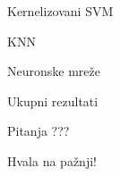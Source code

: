 \documentclass{beamer}
\begin{document}
\begin{frame}{Kernelizovani SVM}
\end{frame}

\begin{frame}{KNN}
\end{frame}

\begin{frame}{Neuronske mre\v{z}e}
\end{frame}

\begin{frame}{Ukupni rezultati}
\end{frame}

\begin{frame}{Pitanja}
    \centering
    ???
\end{frame}

\begin{frame}{}
    \centering
    Hvala na pa\v{z}nji!
\end{frame}
\end{document}
